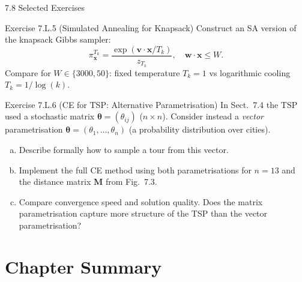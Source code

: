 \documentclass[aspectratio=169,10pt]{beamer}
\newcommand{\bx}{\mathbf{x}}
\newcommand{\bv}{\mathbf{v}}
\newcommand{\bw}{\mathbf{w}}
\newcommand{\btheta}{\boldsymbol{\theta}}
\begin{document}
\begin{frame}[allowframebreaks]{7.8 Selected Exercises}
\begin{block}{Exercise 7.L.5 (Simulated Annealing for Knapsack)}
  Construct an SA version of the knapsack Gibbs sampler:
  \[
    \pi^{T_k}_{\bx} = \frac{\exp(\bv\cdot\bx/T_k)}{z_{T_k}},
    \quad \bw\cdot\bx \le W.
  \]
  Compare for $W \in \{3000, 50\}$: fixed temperature $T_k = 1$ vs
  logarithmic cooling $T_k = 1/\log(k)$.
\end{block}

\framebreak

\begin{block}{Exercise 7.L.6 (CE for TSP: Alternative Parametrisation)}
  In Sect.~7.4 the TSP used a stochastic matrix $\btheta = (\theta_{ij})$
  ($n \times n$).  Consider instead a \emph{vector} parametrisation
  $\btheta = (\theta_1,\ldots,\theta_n)$ (a probability distribution over
  cities).
  \begin{enumerate}[(a)]
    \item Describe formally how to sample a tour from this vector.
    \item Implement the full CE method using both parametrisations for
      $n=13$ and the distance matrix $\mathbf{M}$ from Fig.~7.3.
    \item Compare convergence speed and solution quality.  Does the matrix
      parametrisation capture more structure of the TSP than the vector
      parametrisation?
  \end{enumerate}
\end{block}

\end{frame}

\section{Chapter Summary}
\end{document}
